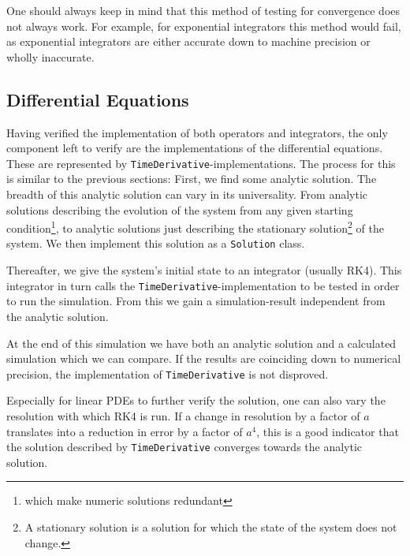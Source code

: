 One should always keep in mind that this method of testing for convergence does not always work.
For example, for exponential integrators this method would fail, as exponential integrators are either accurate down to machine precision or wholly inaccurate.

\subsection{Differential Equations}
Having verified the implementation of both operators and integrators, the only component left to verify are the implementations of the differential equations.
These are represented by \texttt{TimeDerivative}-implementations.
The process for this is similar to the previous sections: First, we find some analytic solution.
The breadth of this analytic solution can vary in its universality.
From analytic solutions describing the evolution of the system from any given starting condition\footnote{which make numeric solutions redundant}, to analytic solutions just describing the stationary solution\footnote{A stationary solution is a solution for which the state of the system does not change.} of the system.
We then implement this solution as a \texttt{Solution} class.

Thereafter, we give the system's initial state to an integrator (usually RK4).
This integrator in turn calls the \texttt{TimeDerivative}-implementation to be tested in order to run the simulation.
From this we gain a simulation-result independent from the analytic solution.

At the end of this simulation we have both an analytic solution and a calculated simulation which we can compare.
If the results are coinciding down to numerical precision, the implementation of \texttt{TimeDerivative} is not disproved.

Especially for linear PDEs to further verify the solution, one can also vary the resolution with which RK4 is run.
If a change in resolution by a factor of $a$ translates into a reduction in error by a factor of $a^4$, this is a good indicator that the solution described by \texttt{TimeDerivative} converges towards the analytic solution.

